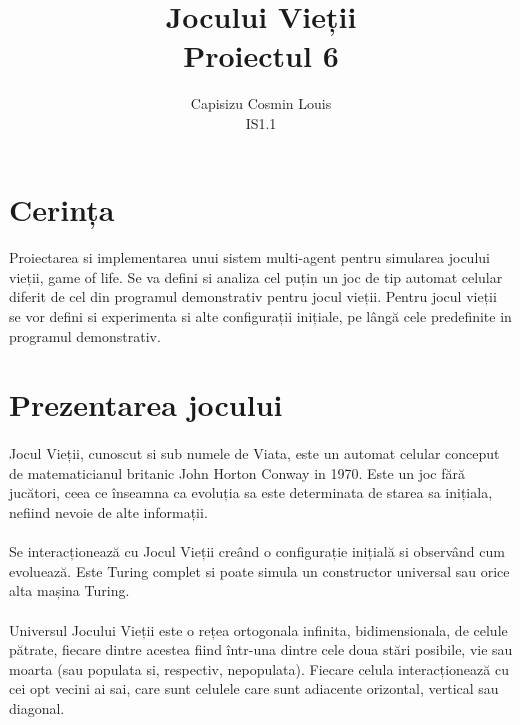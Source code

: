\documentclass[11pt ,A4]{article}
\title{Jocului Vieții\\Proiectul 6}
\author{Capisizu Cosmin Louis\\IS1.1} %
\begin{document}
    \maketitle %
    \pagebreak

    \section{Cerința} %
        \paragraph{}
            Proiectarea si implementarea unui sistem multi-agent pentru simularea jocului vieții, game of life.
            Se va defini si analiza cel puțin un joc de tip automat celular diferit de cel din programul demonstrativ pentru jocul vieții.
            Pentru jocul vieții se vor defini si experimenta si alte configurații inițiale, pe lângă cele predefinite in programul demonstrativ.

    \section{Prezentarea jocului}

        \paragraph{}
            Jocul Vieții, cunoscut si sub numele de Viata, este un automat celular conceput de matematicianul britanic John Horton Conway in 1970.
            Este un joc fără jucători, ceea ce înseamna ca evoluția sa este determinata de starea sa inițiala, nefiind nevoie de alte informații.

        \paragraph{}
            Se interacționează cu Jocul Vieții creând o configurație inițială si observând cum evoluează.
            Este Turing complet si poate simula un constructor universal sau orice alta mașina Turing.

        \paragraph{} Universul Jocului Vieții este o rețea ortogonala infinita, bidimensionala, de celule pătrate, fiecare dintre acestea fiind într-una dintre cele doua stări posibile, vie sau moarta (sau populata si, respectiv, nepopulata). Fiecare celula interacționează cu cei opt vecini ai sai, care sunt celulele care sunt adiacente orizontal, vertical sau diagonal.
\end{document}

